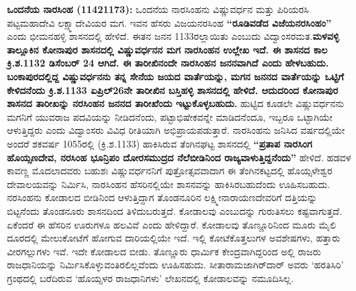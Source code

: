 \textbf{ಒಂದನೆಯ ನಾರಸಿಂಹ (11421173):} ಒಂದನೆಯ ನಾರಸಿಂಹನು ವಿಷ್ಣುವರ್ಧನ ಮತ್ತು ಪಿರಿಯರಸಿ ಪಟ್ಟಮಹಾದೇವಿ ಲಕ್ಷ್ಮಾದೇವಿಯರ ಮಗ. ಇವನ ಹೆಸರು ವಿಜಯನರಸಿಂಹ \textbf{“ರೂಡಿವಡೆದ ವಿಜೆಯನರಸಿಂಹಂ”} ಎಂದು ಭೀಮನಹಳ್ಳಿ ಶಾಸನದಲ್ಲಿ ಹೇಳಿದೆ. ಈತನ ಜನನ 1133ರಲ್ಲಾಯಿತು ಎಂಬುದು ವಿದ್ವಾಂಸರಮತ.\textbf{ಮಳವಳ್ಳಿ ತಾಲ್ಲೂಕಿನ ಕೋನಾಪುರ ಶಾಸನದಲ್ಲಿ ವಿಷ್ಣುವರ್ಧನನ ಮಗ ನಾರಸಿಂಹನ ಉಲ್ಲೇಖ ಇದೆ. ಈ ಶಾಸನದ ಕಾಲ ಕ್ರಿ.ಶ.1132 ಡಿಸೆಂಬರ್​ 24 ಆಗಿದೆ. ಈ ತಾರೀಖಿನಂದೇ ನಾರಸಿಂಹನ ಜನನವಾಗಿದೆ ಎಂದು ಹೇಳಬಹುದು.} \textbf{ಬಂಕಾಪುರದಲ್ಲಿದ್ದ ವಿಷ್ಣುವರ್ಧನನು ತನ್ನ ಸೇನೆಯ ಜಯದ ವಾರ್ತೆಯನ್ನು, ಮಗನ ಜನನದ ವಾರ್ತೆಯನ್ನು ಒಟ್ಟಿಗೆ ಕೇಳಿದನೆಂದು ಕ್ರಿ.ಶ.1133 ಏಪ್ರಿಲ್​ 26ನೇ ತಾರೀಖಿನ ಬಸ್ತಿಹಳ್ಳಿ ಶಾಸನದಲ್ಲಿ ಹೇಳಿದೆ. ಆದುದರಿಂದ ಕೋನಾಪುರ ಶಾಸನದ ತಾರೀಖನ್ನು ನರಸಿಂಹನ ಜನನದ ತಾರೀಖೆಂದು ಇಟ್ಟುಕೊಳ್ಳಬಹುದು.} ಹುಟ್ಟಿದ ಕೂಡಲೇ ವಿಷ್ಣುವರ್ಧನನು ಮಗನಿಗೆ ಯುವರಾಜ ಪದವಿಯನ್ನು ನೀಡಿದನೆಂದು, ಪಟ್ಟಾಭಿಷೇಕವನ್ನೇ ಮಾಡಿದನೆಂದೂ, ಇಬ್ಬರೂ ಒಟ್ಟಾಗಿಯೇ ಆಳುತ್ತಿದ್ದರು ಎಂದು ವಿದ್ವಾಂಸರು ವಿವಿಧ ರೀತಿಯಾಗಿ ಅಭಿಪ್ರಾಯಪಡುತ್ತಾರೆ. ನಾರಸಿಂಹನು ಜನಿಸಿದ ವರ್ಷದಲ್ಲಿಯೇ ಅಂದರೆ ಶಕವರ್ಷ 1055ರಲ್ಲಿ (ಕ್ರಿ.ಶ.1133) ಹಾಕಿಸಿರುವ ತೆಂಗಿನಘಟ್ಟ ಶಾಸನದಲ್ಲಿ \textbf{“ಪ್ರತಾಪ ನಾರಸಿಂಗ ಹೊಯ್ಸಣದೇವ, ನರಸಿಂಹ ಭೂನ್ರಿಪಂ ದೋರಸಮುದ್ರದ ನೆಲೆಬೀಡಿನಿಂದ ರಾಜ್ಯವಾಳುತ್ತಿದ್ದನೆಂದು”} ಹೇಳಿದೆ. ಹಡವಳ ಕಾವಣ್ಣ ಮೊದಲಾದವರು ಬಹುಶಃ ವಿಷ್ಣುವರ್ಧನನಿಗೆ ಪುತ್ರೋತ್ಸವವಾದಾಗ ಈ ತೆಂಗಿನಕಟ್ಟದಲ್ಲಿ ಹೊಯ್ಸಳೇಶ್ವರ ದೇವಾಲಯವನ್ನು ನಿರ್ಮಿಸಿ, ನಾರಸಿಂಹನ ಹೆಸರಿನಲ್ಲಿಯೇ ಶಾಸನವನ್ನು ಹಾಕಿಸಿರಬಹುದೆಂದು ಊಹಿಸಬಹುದು. ನರಸಿಂಹನು ಕೋಡಾಲದ ಬೀಡಿನಿಂದ ಆಳುತ್ತಿದ್ದಾಗ ತೊಂಡನೂರಿನ ಲಕ್ಷ್ಮೀನಾರಾಯಣದೇವರಿಗೆ ದತ್ತಿಯನ್ನು ಬಿಟ್ಟನೆಂದು ತೊಂಡನೂರು ಶಾಸನದಿಂದ ತಿಳಿದುಬರುತ್ತದೆ. ಕೋಡಾಲವು ಎಂಬುದನ್ನು ಗುರುತಿಸಲು ಕಷ್ಟವಾಗುತ್ತದೆ. ಏಕೆಂದರೆ ಈ ಹೆಸರಿನ ಊರುಗಳೂ ಹಲವಿವೆ ಎಂದು ಹೇಳಿದ್ದಾರೆ. ಕೋಡಾಲವು ತೊಣ್ಣೂರಿನಿಂದ ಮೂರು ಮೈಲಿ ದೂರದಲ್ಲಿ ಮೇಲುಕೋಟೆಗೆ ಹೋಗುವ ದಾರಿಯಲ್ಲಿಯೇ ಇದೆ. ಇಲ್ಲಿ ಕೋಟೆಕೊತ್ತಲುಗಳ ಅವಶೇಷಗಳು, ಹತ್ತಾರು ವೀರಗಲ್ಲುಗಳು ಇವೆ. ಇದೇ ಕೋಡಾಲದ ಬೀಡು. ತೊಣ್ಣೂರು ಧಾರ್ಮಿಕ ಕೇಂದ್ರವಾಗಿದ್ದರಿಂದ ಅಲ್ಲಿ ರಾಜರು ರಾಜಧಾನಿಯನ್ನು ನಿರ್ಮಿಸಿಕೊಳ್ಳುವಂತಿರ\-ಲಿಲ್ಲವೆಂದು ಊಹಿಸಹುದು. ಸೀತಾರಾಮಜಾಗಿರ್​ದಾರ್​ ಅವರು `ಹರತಿಸಿರಿ' ಗ್ರಂಥದಲ್ಲಿ ಬರೆದಿರುವ ‘ಹೊಯ್ಸಳರ ರಾಜಧಾನಿಗಳು’ ಲೇಖನದಲ್ಲಿ ಕೋಡಾಲವನ್ನು ನಮೂದಿಸಿಲ್ಲ.


